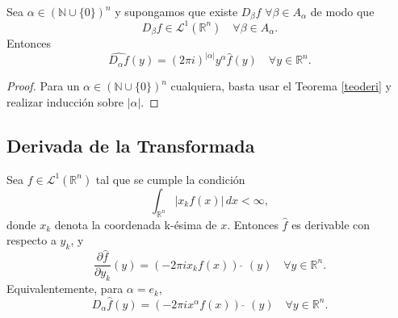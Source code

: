 \begin{teorema}
 Sea $\alpha \in (\mathbb{N} \cup \{0\})^n$ y supongamos que existe $D_{\beta}f \, \,  \forall  \beta \in A_{\alpha}$ de modo que
\begin{equation}
    D_{\beta}f \in \mathscr{L}^1(\mathbb{R}^n) \quad \forall  \beta \in A_{\alpha}.
\end{equation}
Entonces
\begin{equation}
    \widehat{D_{\alpha}f}(y) = (2\pi i)^{|\alpha|}y^\alpha \widehat{f}(y) \quad \forall y \in \mathbb{R}^n.
\end{equation}
\end{teorema}

\begin{proof}
    Para un $\alpha \in ( \mathbb{N} \cup \{0\})^n$ cualquiera, basta usar el Teorema \ref{teoderi} y realizar inducción sobre $|\alpha|$. 
\end{proof}




















\subsection{Derivada de la Transformada}
\begin{teorema}\label{teo:der_trans}
   Sea $f \in \mathscr{L}^1(\mathbb{R}^n)$ tal que se cumple la condición 
   \begin{equation}\int_{\mathbb{R}^n}|x_kf(x)| \, dx < \infty,
   \end{equation}
   donde $x_k$ denota la coordenada k-ésima de $x$.
   Entonces $\widehat{f}$ es derivable con respecto a $y_k$, y
   \begin{equation}\label{eq:ecuacion}
    \frac{\partial \widehat{f}}{\partial y_k}(y) = (-2 \pi ix_k f (x))\,\,\widehat{  } \,\, (y) \quad \forall  y \in \mathbb{R}^n.
   \end{equation}
   Equivalentemente, para $\alpha = e_k $,
   \begin{equation}
     D_{\alpha}\widehat{f}(y) = (-2 \pi ix^{\alpha} f (x))\,\,\widehat{  } \,\, (y) \quad \forall  y \in \mathbb{R}^n.
   \end{equation}
\end{teorema}


